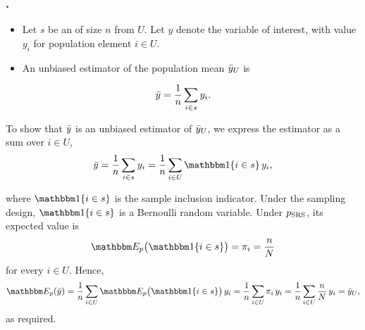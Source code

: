 \documentclass{my_eth_beamer}
\numberwithin{equation}{section}
\begin{document}
\begin{frame}
    \frametitle{\insertsectionnumber.\insertsubsectionnumber~\insertsubsection}
    \begin{itemize}
    \setlength{\itemsep}{8pt}
        \item Let $s$ be an \SRS of size $n$ from $U$. Let $y$ denote the
            variable of interest, with value $y_i$ for population element $i
            \in U$.
        \item An \alert{unbiased} estimator of the \alert{population mean}
            $\bar{y}_U$ is
    \end{itemize}
    \vspace{0.5em}
    \begin{equation*}
        \bar{y} = \frac{1}{n} \sum_{i \in s} y_i.
    \end{equation*}
    \vspace{-0.5em}
    \begin{Exkurs}[Unbiasedness]\label{exkurs:srs_unbiased}
        \vspace{-0.25em}
        To show that $\bar{y}$ is an unbiased estimator of $\bar{y}_U$, we express
        the estimator as a sum over $i \in U$,
        \begin{equation*}
            \mys = \frac{1}{n} \sum_{i \in s} y_i =
                \frac{1}{n} \sum_{i \in U} \indicator\{i \in s\} \, y_i,
        \end{equation*}
    \end{Exkurs}
\end{frame}

\begin{frame}
    \begin{Exkurs_forts}[Cont.]
        \vspace{0.25em}
        where $\indicator\{i \in s\}$ is the sample inclusion indicator.
        Under the sampling design, $\indicator\{i \in s\}$ is a Bernoulli
        random variable. Under $p_{\mathrm{SRS}}$, its expected value is
        \begin{equation*}
            \EE\big(\indicator\{i \in s\}\big) = \pi_i = \frac{n}{N}
        \end{equation*}
        for every $i \in U$. Hence,
        \begin{equation*}
            \EE(\mys) = \frac{1}{n} \sum_{i \in U}
                \EE\big(\indicator\{i \in s\}\big) \, y_i =
                    \frac{1}{n} \sum_{i \in U} \pi_i \, y_i =
                    \frac{1}{n} \sum_{i \in U} \frac{n}{N} \, y_i = \myu,
        \end{equation*}
        \noindent as required.
    \end{Exkurs_forts}
\end{frame}
\end{document}
